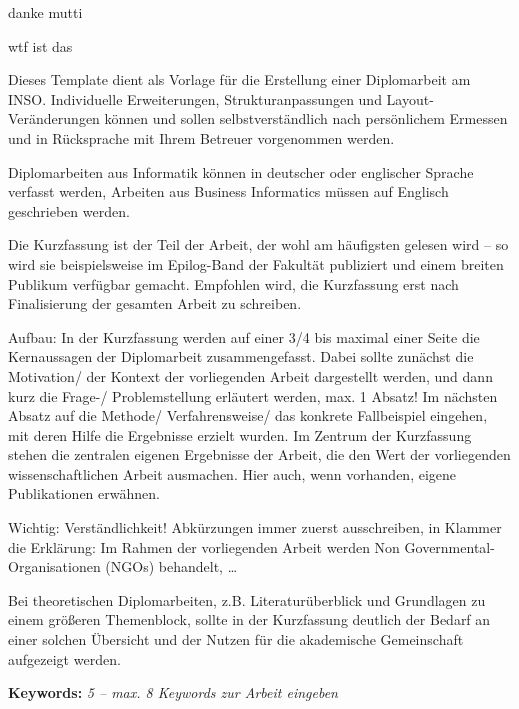 \documentclass[draft,final]{vutinfth} %
\begin{document}
\frontmatter %

\addstatementpage

\begin{danksagung*}
danke mutti
\end{danksagung*}

\begin{acknowledgements*}
wtf ist das
\end{acknowledgements*}

\begin{kurzfassung}
Dieses Template dient als Vorlage für die Erstellung einer Diplomarbeit am INSO. Individuelle Erweiterungen, Strukturanpassungen und Layout-Veränderungen können und sollen selbstverständlich nach persönlichem Ermessen und in Rücksprache mit Ihrem Betreuer vorgenommen werden. 

Diplomarbeiten aus Informatik können in deutscher oder englischer Sprache verfasst werden, Arbeiten aus Business Informatics müssen auf Englisch geschrieben werden.

Die Kurzfassung ist der Teil der Arbeit, der wohl am häufigsten gelesen wird – so wird sie beispielsweise im Epilog-Band der Fakultät publiziert und einem breiten Publikum verfügbar gemacht. Empfohlen wird, die Kurzfassung erst nach Finalisierung der gesamten Arbeit zu schreiben.

Aufbau: In der Kurzfassung werden auf einer 3/4 bis maximal einer Seite die Kernaussagen der Diplomarbeit zusammengefasst. Dabei sollte zunächst die Motivation/ der Kontext der vorliegenden Arbeit dargestellt werden, und dann kurz die Frage-/ Problemstellung erläutert werden, max. 1 Absatz! Im nächsten Absatz auf die Methode/ Verfahrensweise/ das konkrete Fallbeispiel eingehen, mit deren Hilfe die Ergebnisse erzielt wurden. Im Zentrum der Kurzfassung stehen die zentralen eigenen Ergebnisse der Arbeit, die den Wert der vorliegenden wissenschaftlichen Arbeit ausmachen. Hier auch, wenn vorhanden, eigene Publikationen erwähnen.

Wichtig: Verständlichkeit! Abkürzungen immer zuerst ausschreiben, in Klammer die Erklärung: Im Rahmen der vorliegenden Arbeit werden Non Governmental-Organisationen (NGOs) behandelt, \ldots

Bei theoretischen Diplomarbeiten, z.B. Literaturüberblick und Grundlagen zu einem größeren Themenblock, sollte in der Kurzfassung deutlich der Bedarf an einer solchen Übersicht und der Nutzen für die akademische Gemeinschaft aufgezeigt werden.


\textbf{Keywords:} \emph{5 – max. 8 Keywords zur Arbeit eingeben}
\end{kurzfassung}
\end{document}
